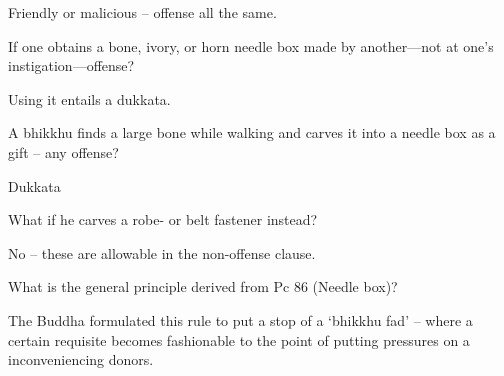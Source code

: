 \bigskip

\begin{solution}
  Friendly or malicious – offense all the same.
\end{solution}


If one obtains a bone, ivory, or horn needle box made by another—not at one’s instigation—offense?

\begin{solution}
  Using it entails a dukkata. 
\end{solution}

\bigskip

A bhikkhu finds a large bone while walking and carves it into a needle box as a gift – any offense?

\begin{solution}
  Dukkata
\end{solution}

\bigskip

What if he carves a robe- or belt fastener instead?

\begin{solution}
  No – these are allowable in the non-offense clause. 
\end{solution}

\bigskip

What is the general principle derived from Pc 86 (Needle box)?

\begin{solution}
  The Buddha formulated this rule to put a stop of a ‘bhikkhu fad’ – where a
  certain requisite becomes fashionable to the point of putting pressures on a
  inconveniencing donors.
\end{solution}

